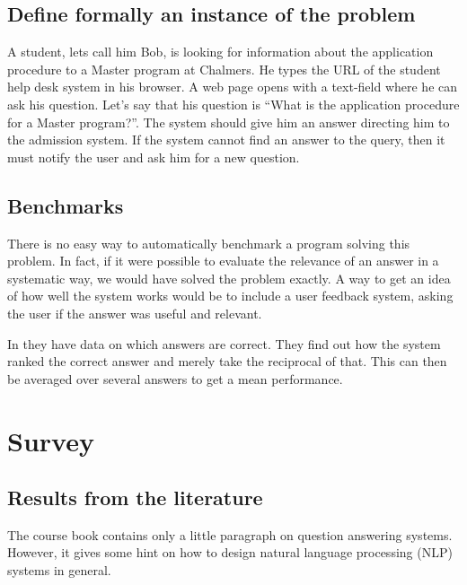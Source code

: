 \documentclass[a4paper,11pt]{article}
\begin{document}
\subsection{Define formally an instance of the problem}
A student, lets call him Bob, is looking for information about the application
procedure to a Master program at Chalmers. He types the URL of the student help
desk system in his browser. A web page opens with a text-field where he can ask
his question. Let's say that his question is ``What is the application procedure
for a Master program?''. The system should give him an answer directing him to
the admission system. If the system cannot find an answer to the query, then it
must notify the user and ask him for a new question.

\subsection{Benchmarks}

There is no easy way to automatically benchmark a program solving this
problem. In fact, if it were possible to evaluate the relevance of an
answer in a systematic way, we would have solved the problem exactly.
A way to get an idea of how well the system works would be to include
a user feedback system, asking the user if the answer was useful and
relevant. 

In \cite{rankingsuspected} they have data on which answers are
correct. They find out how the system ranked the correct answer
and merely take the reciprocal of that. This can then be averaged
over several answers to get a mean performance.

\section{Survey}
\subsection{Results from the literature}
The course book \cite{aimodern} contains only a little paragraph on question
answering systems. However, it gives some hint on how to design natural language
processing (NLP) systems in general.
\end{document}
